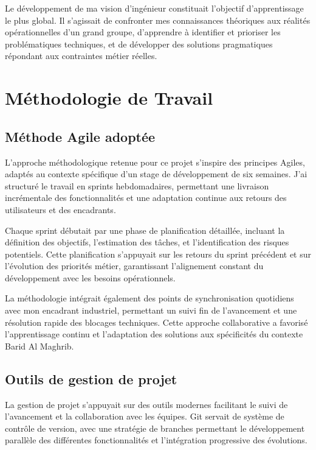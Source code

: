 Le développement de ma vision d'ingénieur constituait l'objectif d'apprentissage le plus global. Il s'agissait de confronter mes connaissances théoriques aux réalités opérationnelles d'un grand groupe, d'apprendre à identifier et prioriser les problématiques techniques, et de développer des solutions pragmatiques répondant aux contraintes métier réelles.

\section{Méthodologie de Travail}

\subsection{Méthode Agile adoptée}

L'approche méthodologique retenue pour ce projet s'inspire des principes Agiles, adaptés au contexte spécifique d'un stage de développement de six semaines. J'ai structuré le travail en sprints hebdomadaires, permettant une livraison incrémentale des fonctionnalités et une adaptation continue aux retours des utilisateurs et des encadrants.

Chaque sprint débutait par une phase de planification détaillée, incluant la définition des objectifs, l'estimation des tâches, et l'identification des risques potentiels. Cette planification s'appuyait sur les retours du sprint précédent et sur l'évolution des priorités métier, garantissant l'alignement constant du développement avec les besoins opérationnels.

La méthodologie intégrait également des points de synchronisation quotidiens avec mon encadrant industriel, permettant un suivi fin de l'avancement et une résolution rapide des blocages techniques. Cette approche collaborative a favorisé l'apprentissage continu et l'adaptation des solutions aux spécificités du contexte Barid Al Maghrib.

\subsection{Outils de gestion de projet}

La gestion de projet s'appuyait sur des outils modernes facilitant le suivi de l'avancement et la collaboration avec les équipes. Git servait de système de contrôle de version, avec une stratégie de branches permettant le développement parallèle des différentes fonctionnalités et l'intégration progressive des évolutions.

